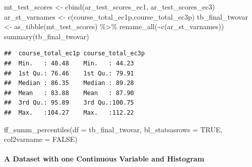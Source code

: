 \documentclass[
]{book}
\newenvironment{Shaded}{\begin{snugshade}}{\end{snugshade}}
\newcommand{\AttributeTok}[1]{\textcolor[rgb]{0.77,0.63,0.00}{#1}}
\newcommand{\ConstantTok}[1]{\textcolor[rgb]{0.00,0.00,0.00}{#1}}
\newcommand{\FunctionTok}[1]{\textcolor[rgb]{0.00,0.00,0.00}{#1}}
\newcommand{\NormalTok}[1]{#1}
\newcommand{\OtherTok}[1]{\textcolor[rgb]{0.56,0.35,0.01}{#1}}
\newcommand{\SpecialCharTok}[1]{\textcolor[rgb]{0.00,0.00,0.00}{#1}}
\newcommand{\StringTok}[1]{\textcolor[rgb]{0.31,0.60,0.02}{#1}}
\begin{document}
\begin{Shaded}
\begin{Highlighting}[]
\NormalTok{mt\_test\_scores }\OtherTok{\textless{}{-}} \FunctionTok{cbind}\NormalTok{(ar\_test\_scores\_ec1, ar\_test\_scores\_ec3)}
\NormalTok{ar\_st\_varnames }\OtherTok{\textless{}{-}} \FunctionTok{c}\NormalTok{(}\StringTok{\textquotesingle{}course\_total\_ec1p\textquotesingle{}}\NormalTok{,}\StringTok{\textquotesingle{}course\_total\_ec3p\textquotesingle{}}\NormalTok{)}
\NormalTok{tb\_final\_twovar }\OtherTok{\textless{}{-}} \FunctionTok{as\_tibble}\NormalTok{(mt\_test\_scores) }\SpecialCharTok{\%\textgreater{}\%} \FunctionTok{rename\_all}\NormalTok{(}\SpecialCharTok{\textasciitilde{}}\FunctionTok{c}\NormalTok{(ar\_st\_varnames))}
\FunctionTok{summary}\NormalTok{(tb\_final\_twovar)}
\end{Highlighting}
\end{Shaded}

\begin{verbatim}
##  course_total_ec1p course_total_ec3p
##  Min.   : 40.48    Min.   : 44.23   
##  1st Qu.: 76.46    1st Qu.: 79.91   
##  Median : 86.35    Median : 89.28   
##  Mean   : 83.88    Mean   : 87.90   
##  3rd Qu.: 95.89    3rd Qu.:100.75   
##  Max.   :104.27    Max.   :112.22
\end{verbatim}

\begin{Shaded}
\begin{Highlighting}[]
\FunctionTok{ff\_summ\_percentiles}\NormalTok{(}\AttributeTok{df =}\NormalTok{ tb\_final\_twovar, }\AttributeTok{bl\_statsasrows =} \ConstantTok{TRUE}\NormalTok{, }\AttributeTok{col2varname =} \ConstantTok{FALSE}\NormalTok{)}
\end{Highlighting}
\end{Shaded}

\hypertarget{a-dataset-with-one-continuous-variable-and-histogram}{%
\paragraph{A Dataset with one Continuous Variable and Histogram}\label{a-dataset-with-one-continuous-variable-and-histogram}}
\end{document}
